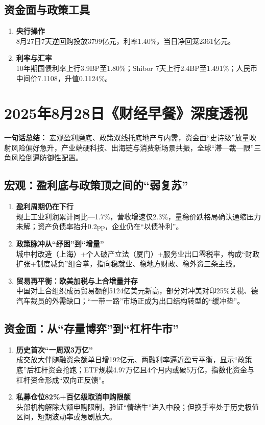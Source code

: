 \subsection{资金面与政策工具}
\begin{enumerate}[leftmargin=*, nosep]
    \item \textbf{央行操作}  \\
    8月27日7天{\color{red}逆回购}投放3799亿元，利率1.40\%，当日净回笼2361亿元。
    \item \textbf{利率与汇率}  \\
    10年期国债利率上行3.9BP至1.80\%；Shibor 7天上行2.4BP至1.491\%；人民币中间价7.1108，升值0.1124\%。
\end{enumerate}


\section{2025年8月28日《财经早餐》深度透视}
\textbf{一句话总结：}  
宏观盈利磨底、政策双线托底地产与内需，资金面“史诗级”放量映射风险偏好急升，产业端硬科技、出海链与消费新场景共振，全球“滞—裁—限”三角风险倒逼防御性配置。

\subsection{宏观：盈利底与政策顶之间的“弱复苏”}
\begin{enumerate}[leftmargin=*, nosep]
    \item \textbf{盈利周期仍在下行}  \\
    规上工业利润累计同比—1.7\%，营收增速仅2.3\%，{\color{red}量稳价跌格局确认通缩压力未解}；资产负债率抬升0.2pp，企业仍在{\color{red}“以债补利”}。
    \item \textbf{政策脉冲从“纾困”到“增量”}  \\
    城中村改造（上海）+个人破产立法（厦门）+服务业出口零税率，构成{\color{red}“财政扩张+制度减负”}组合拳，指向{\color{red}稳就业、稳地方财政、稳外资}三条主线。
    \item \textbf{贸易再平衡：欧美加税与上合增量并存}  \\
    中国对上合组织成员贸易额创5124亿美元新高，部分对冲美对印25\%关税、德汽车裁员的外需缺口；“一带一路”市场正成为出口结构转型的“缓冲垫”。
\end{enumerate}

\subsection{资金面：从“存量博弈”到“杠杆牛市”}
\begin{enumerate}[leftmargin=*, nosep]
    \item \textbf{历史首次“一周双3万亿”}  \\
    成交放大伴随融资余额单日增192亿元、两融利率逼近盈亏平衡，显示“政策底”后杠杆资金抢跑；ETF规模4.97万亿且4个月内或破5万亿，指数化资金与杠杆资金形成“双向正反馈”。
    \item \textbf{私募仓位82\%+百亿级取消申购限额}  \\
    头部机构解除大额申购限制，验证“情绪牛”进入中段；但换手率处于历史极值区间，短期波动率或急剧放大。
\end{enumerate}

